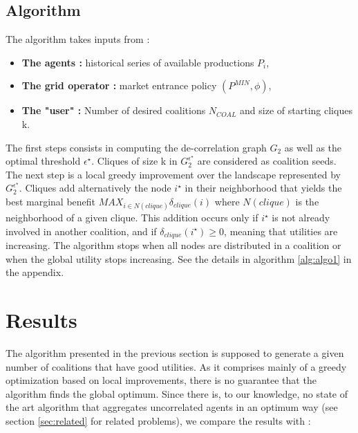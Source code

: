 \documentclass[conference]{IEEEtran}
\begin{document}
\subsection{Algorithm}
The algorithm takes inputs from :

\begin{itemize}
	\item \textbf{The agents :} historical series of available productions $P_{i}$, 
	\item \textbf{The grid operator :} market entrance policy $ (P^{MIN},\phi) $,
	\item \textbf{The "user" :} Number of desired coalitions $ N_{COAL} $ and size of starting cliques k.
\end{itemize} 

The first steps consists in computing the de-correlation graph $ G_{2} $ as well as the optimal threshold $ \epsilon^{\star} $. Cliques of size k in $ G_{2}^{\epsilon^{\star}} $ are considered as coalition seeds. The next step is a local greedy improvement over the landscape represented by  $ G_{2}^{\epsilon^{\star}} $. Cliques add alternatively the node $ i^{\star} $ in their neighborhood that yields the best marginal benefit $ MAX_{ i \in N(clique) } \delta_{clique}(i) $ where $ N(clique) $ is the neighborhood of a given clique. This addition occurs only if $ i^{\star} $ is not already involved in another coalition, and if $ \delta_{clique}(i^{\star}) \geq 0 $, meaning that utilities are increasing. The algorithm stops when all nodes are distributed in a coalition or when the global utility stops increasing. See the details in algorithm \ref{alg:algo1} in the appendix.


%
%
\section{Results}
\label{sec:results}

The algorithm presented in the previous section is supposed to generate a given number of coalitions that have good utilities. As it comprises mainly of a greedy optimization based on local improvements, there is no guarantee that the algorithm finds the global optimum. Since there is, to our knowledge, no state of the art algorithm that aggregates uncorrelated agents in an optimum way (see section \ref{sec:related} for related problems), we compare the results with :
\end{document}
